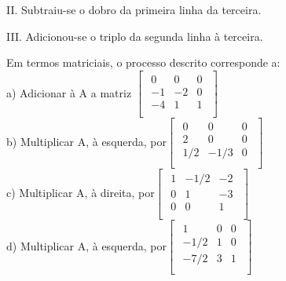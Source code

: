 \documentclass{article}
\begin{document}
\begin{enumerate}
II. Subtraiu-se o dobro da primeira linha da terceira.

III. Adicionou-se o triplo da segunda linha à terceira.

Em termos matriciais, o processo descrito corresponde a:\\


a) Adicionar à A a matriz $\left [ \begin{matrix} 
    \begin{array}{ccc}
    0 & 0 & 0  \\
    -1 & -2 & 0  \\
    -4 & 1 & 1  \\
\end{array}
\end{matrix} \right ]$ \newline\\



b) Multiplicar A, à esquerda, por$\left [ \begin{matrix} 
    \begin{array}{ccc}
    0 & 0 & 0  \\
    2 & 0 & 0  \\
    1/2 & -1/3 & 0  \\
\end{array}
\end{matrix} \right ]$ \newline\\



c) Multiplicar A, à direita, por$\left [ \begin{matrix} 
    \begin{array}{ccc}
    1 & -1/2 & -2  \\
    0 & 1 & -3  \\
    0 & 0 & 1  \\
\end{array}
\end{matrix} \right ]$ \newline\\




d) Multiplicar A, à esquerda, por$\left [ \begin{matrix} 
    \begin{array}{ccc}
    1 & 0 & 0  \\
    -1/2 & 1 & 0  \\
    -7/2 & 3 & 1  \\
\end{array}
\end{matrix} \right ]$ \newline\\




\end{enumerate}
\end{document}
